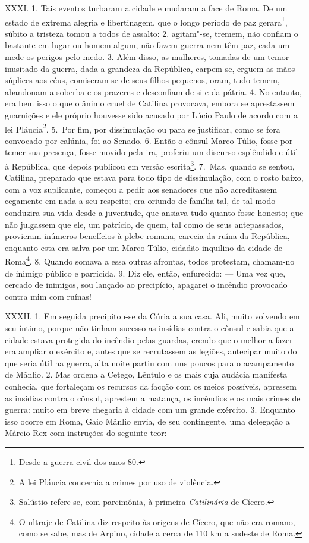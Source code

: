 XXXI. 1. Tais eventos turbaram a cidade e mudaram a face de Roma. De um estado
de extrema alegria e libertinagem, que o longo período de paz
gerara\footnote{Desde a guerra civil dos anos 80.}, súbito a tristeza tomou a
todos de assalto: 2. agitam"-se, tremem, não confiam o bastante em lugar ou
homem algum, não fazem guerra nem têm paz, cada um mede os perigos pelo medo.
3. Além disso, as mulheres, tomadas de um temor inusitado da guerra, dada a
grandeza da República, carpem-se, erguem as mãos súplices aos céus,
comiseram-se de seus filhos pequenos, oram, tudo temem, abandonam a soberba e
os prazeres e desconfiam de si e da pátria. 4. No entanto, era bem isso o que o
ânimo cruel de Catilina provocava, embora se aprestassem guarnições e ele
próprio houvesse sido acusado por Lúcio Paulo de acordo com a lei
Pláucia\footnote{A lei Pláucia concernia a crimes por uso de violência.}. 5.~Por fim,
por dissimulação ou para se justificar, como se fora convocado por
calúnia, foi ao Senado. 6. Então o cônsul Marco Túlio, fosse por temer sua
presença, fosse movido pela ira, proferiu um discurso esplêndido e útil à
República, que depois publicou em versão escrita\footnote{Salústio refere-se,
com parcimônia, à primeira \emph{Catilinária} de Cícero.}. 7.~Mas, quando se
sentou, Catilina, preparado que estava para todo tipo de dissimulação, com o
rosto baixo, com a voz suplicante, começou a pedir aos senadores que não
acreditassem cegamente em nada a seu respeito; era oriundo de família tal, de
tal modo conduzira sua vida desde a juventude, que ansiava tudo quanto fosse
honesto; que não julgassem que ele, um patrício, de quem, tal como de seus
antepassados, provieram inúmeros benefícios à plebe romana, carecia da ruína da
República, enquanto esta era salva por um Marco Túlio, cidadão inquilino da
cidade de Roma\footnote{O ultraje de Catilina diz respeito às origens de
Cícero, que não era romano, como se sabe, mas de Arpino, cidade a cerca de 110
km a sudeste de Roma.}. 8. Quando somava a essa outras afrontas, todos
protestam, chamam-no de inimigo público e parricida. 9. Diz ele, então,
enfurecido: --- Uma vez que, cercado de inimigos, sou lançado ao precipício,
apagarei o incêndio provocado contra mim com ruínas!

XXXII. 1. Em seguida precipitou-se da Cúria a sua casa. Ali, muito volvendo em
seu íntimo, porque não tinham sucesso as insídias contra o cônsul e sabia que a
cidade estava protegida do incêndio pelas guardas, crendo que o melhor a fazer
era ampliar o exército e, antes que se recrutassem as legiões, antecipar muito
do que seria útil na guerra, alta noite partiu com uns poucos para o
acampamento de Mânlio. 2. Mas ordena a Cetego, Lêntulo e os mais cuja audácia
manifesta conhecia, que fortaleçam os recursos da facção com os meios
possíveis, apressem as insídias contra o cônsul, aprestem a matança, os
incêndios e os mais crimes de guerra: muito em breve chegaria à cidade com um
grande exército. 3. Enquanto isso ocorre em Roma, Gaio Mânlio envia, de seu contingente, uma delegação  a Márcio
Rex com instruções do seguinte teor:

